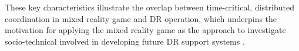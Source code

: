 These key characteristics illustrate the overlap between time-critical, distributed coordination in mixed reality game and DR operation, which underpins the motivation for applying the mixed reality game as the approach to investigate socio-technical involved in developing future DR support systems \cite{Fischer2012}.\\









